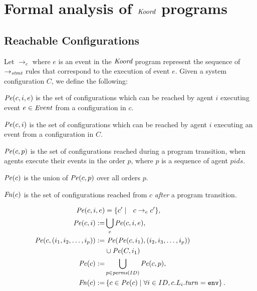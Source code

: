 \section{Formal analysis of $\emph{Koord}$ programs}
\label{sec:verification}

\subsection{Reachable Configurations}
Let $\rightarrow_{e}$ where $e$ is an event in the $\emph{Koord}$ program represent the sequence of $\rightarrow_\mathit{stmt}$ rules that correspond to the execution of event $e$. Given a system configuration $C$, we define the following:
 \begin{inparaenum}[(i)]
     \item $\mathit{Pe}(c,i,e)$ is the set of configurations which can be reached by agent $i$ executing event $e \in \mathit{Event}$ from a configuration in $c$.
     \item$\mathit{Pe}(c,i)$ is the set of configurations which can be reached by agent $i$ executing an event from a configuration in $C$.
     \item$\mathit{Pe}(c,p)$ is the set of configurations reached during a program transition, when agents execute their events in the order $p$, where $p$ is a sequence of agent $\mathit{pids}$.
     \item $\mathit{Pe}(c)$ is the union of $\mathit{Pe}(c,p)$ over all orders $p$.
     \item$\mathit{Fn}(c)$ is the set of configurations reached from $c$ \emph{after} a program transition.
 \end{inparaenum}
\vspace{1mm}
\begin{mdframed}
\footnotesize
\begin{align*}
    \Post (c,i,e) &= \{ c^\prime\mid \ \ c\rightarrow_{e} c^\prime \},\\
\Post(c,i) :=& \bigcup_e \Post(c,i,e),\\
\Post(c,(i_1,i_2,\ldots ,i_p)) := & \ \Post(\Post(c,i_1),(i_2,i_3,\ldots,i_p))\\ & \cup \Post(C,i_1)\\
\Post(c) :=& \bigcup_{p\in \mathit{perms}(\UINS)} \Post(c,p), \\
\Final(c) :=& \left\{ c\in \Post(c)\mid \forall i \in \UINS, c.L_i.\turn = \env \right\}.
\end{align*}
\end{mdframed}

